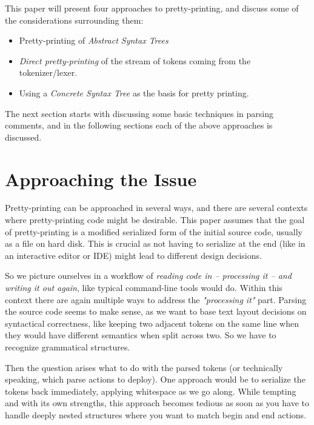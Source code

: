\documentclass[11pt,a4paper]{article}
\begin{document}
This paper will present four approaches to pretty-printing, and discuss some of the considerations surrounding them:
\begin{itemize}
  \item Pretty-printing of \emph{Abstract Syntax Trees}
  \item \emph{Direct pretty-printing} of the stream of tokens coming from the tokenizer/lexer.
  \item Using a \emph{Concrete Syntax Tree} as the basis for pretty printing.
\end{itemize}

The next section starts with discussing some basic techniques in parsing comments, and in the following sections each of the above approaches is discussed.



\section{Approaching the Issue}

Pretty-printing can be approached in several ways, and there are several
contexts where pretty-printing code might be desirable. This paper assumes that
the goal of pretty-printing is a modified serialized form of the initial source
code, usually as a file on hard disk. This is crucial as not having to serialize
at the end (like in an interactive editor or IDE) might lead to different design
decisions.

So we picture ourselves in a workflow of \emph{reading code in --
processing it -- and writing it out again}, like typical command-line tools
would do. Within this context there are again multiple ways to address the
\emph{"processing it"} part. Parsing the source code seems to make sense, as we
want to base text layout decisions on syntactical correctness, like keeping two
adjacent tokens on the same line when they would have different semantics when
split across two. So we have to recognize grammatical structures.

Then the question arises what to do with the parsed tokens (or technically
speaking, which parse actions to deploy). One approach would be to serialize the
tokens back immediately, applying whitespace as we go along. While tempting and
with its own strengths, this approach becomes tedious as soon as you have to handle
deeply nested structures where you want to match begin and end actions.
\end{document}

